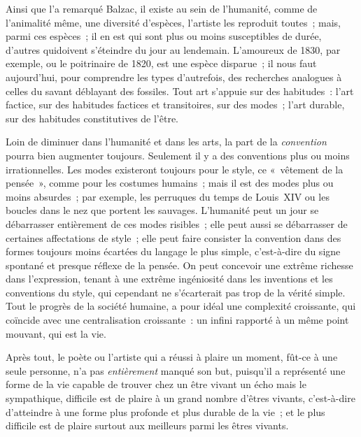 \documentclass[french,twoside]{book} %
\begin{document}
Ainsi que l’a remarqué Balzac, il existe au sein de l’humanité, comme de l’animalité même, une diversité d’espèces, l’artiste les reproduit toutes ; mais, parmi ces espèces ; il en est qui sont plus ou moins susceptibles de durée, d’autres quidoivent s’éteindre du jour au lendemain. L’amoureux de 1830, par exemple, ou le poitrinaire de 1820, est une espèce disparue ; il nous faut aujourd’hui, pour comprendre les types d’autrefois, des recherches analogues à celles du savant déblayant des fossiles. Tout art s’appuie sur des habitudes : l’art factice, sur des habitudes factices et transitoires, sur des modes ; l’art durable, sur des habitudes constitutives de l’être.\par
Loin de diminuer dans l’humanité et dans les arts, la part de la \emph{convention} pourra bien augmenter toujours. Seulement il y a des conventions plus ou moins irrationnelles. Les modes existeront toujours pour le style, ce « vêtement de la pensée », comme pour les costumes humains ; mais il est des modes plus ou moins absurdes ; par exemple, les perruques du temps de Louis XIV ou les boucles dans le nez que portent les sauvages. L’humanité peut un jour se débarrasser entièrement de ces modes risibles ; elle peut aussi se débarrasser de certaines affectations de style ; elle peut faire consister la convention dans des formes toujours moins écartées du langage le plus simple, c’est-à-dire du signe spontané et presque réflexe de la pensée. On peut concevoir une extrême richesse dans l’expression, tenant à une extrême ingéniosité dans les inventions et les conventions du style, qui cependant ne s’écarterait pas trop de la vérité simple. Tout le progrès de la société humaine, a pour idéal une complexité croissante, qui coïncide avec une centralisation croissante : un infini rapporté à un même point mouvant, qui est la vie.\par
Après tout, le poète ou l’artiste qui a réussi à plaire un moment, fût-ce à une seule personne, n’a pas \emph{entièrement} manqué son but, puisqu’il a représenté une forme de la vie capable de trouver chez un être vivant un écho mais le sympathique, difficile est de plaire à un grand nombre d’êtres vivants, c’est-à-dire d’atteindre à une forme plus profonde et plus durable de la vie ; et le plus difficile est de plaire surtout aux meilleurs parmi les êtres vivants.\par
\end{document}
